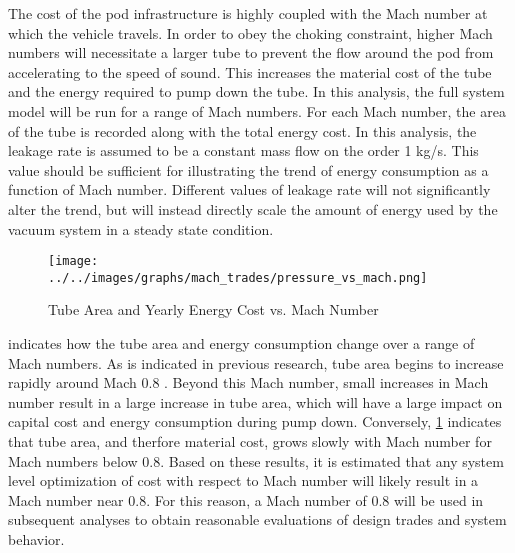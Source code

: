 The cost of the pod infrastructure is highly coupled with the
Mach number at which the vehicle travels. In order to obey the choking constraint,
higher Mach numbers will necessitate a larger tube to prevent the flow around
the pod from accelerating to the speed of sound. This increases the material
cost of the tube and the energy required to pump down the tube. In this analysis,
the full system model will be run for a range of Mach numbers.
For each Mach number, the area of the tube is recorded along with the total energy cost.
In this analysis, the leakage rate is assumed to be a constant mass flow on the order 1 kg/s.
This value should be sufficient for illustrating the trend of energy
consumption as a function of Mach number. Different values of leakage rate will
not significantly alter the trend, but will instead directly scale the amount
of energy used by the vacuum system in a steady state condition.
\begin{figure}
	\centering
	\texttt{[image: ../../images/graphs/mach\_trades/pressure\_vs\_mach.png]}
	\caption{Tube Area and Yearly Energy Cost vs. Mach Number}
	\label{fig:tube_area_cost_vs_mach}
\end{figure}
 indicates how the tube area and energy
consumption change over a range of Mach numbers. As is indicated in previous research,
tube area begins to increase rapidly around Mach 0.8 \cite{Chin}.
Beyond this Mach number, small increases in Mach number result in a large
increase in tube area, which will have a large impact on capital cost and energy
consumption during pump down. Conversely, \cref{fig:tube_area_cost_vs_mach}
indicates that tube area, and therfore material cost,
grows slowly with Mach number for Mach numbers below 0.8.
Based on these results, it is estimated that any
system level optimization of cost with respect to Mach number will likely result in a
Mach number near 0.8. For this reason, a Mach number of 0.8 will be used in
subsequent analyses to obtain reasonable evaluations of design trades and system behavior.
